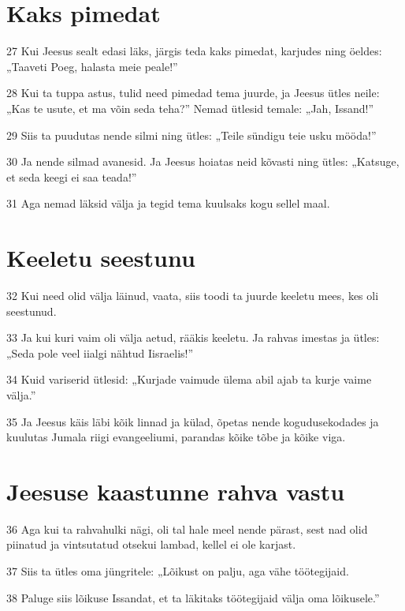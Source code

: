 \section*{Kaks pimedat}

\par 27 Kui Jeesus sealt edasi läks, järgis teda kaks pimedat, karjudes ning öeldes: „Taaveti Poeg, halasta meie peale!”
\par 28 Kui ta tuppa astus, tulid need pimedad tema juurde, ja Jeesus ütles neile: „Kas te usute, et ma võin seda teha?” Nemad ütlesid temale: „Jah, Issand!”
\par 29 Siis ta puudutas nende silmi ning ütles: „Teile sündigu teie usku mööda!”
\par 30 Ja nende silmad avanesid. Ja Jeesus hoiatas neid kõvasti ning ütles: „Katsuge, et seda keegi ei saa teada!”
\par 31 Aga nemad läksid välja ja tegid tema kuulsaks kogu sellel maal.

\section*{Keeletu seestunu}

\par 32 Kui need olid välja läinud, vaata, siis toodi ta juurde keeletu mees, kes oli seestunud.
\par 33 Ja kui kuri vaim oli välja aetud, rääkis keeletu. Ja rahvas imestas ja ütles: „Seda pole veel iialgi nähtud Iisraelis!”
\par 34 Kuid variserid ütlesid: „Kurjade vaimude ülema abil ajab ta kurje vaime välja.”
\par 35 Ja Jeesus käis läbi kõik linnad ja külad, õpetas nende kogudusekodades ja kuulutas Jumala riigi evangeeliumi, parandas kõike tõbe ja kõike viga.

\section*{Jeesuse kaastunne rahva vastu}

\par 36 Aga kui ta rahvahulki nägi, oli tal hale meel nende pärast, sest nad olid piinatud ja vintsutatud otsekui lambad, kellel ei ole karjast.
\par 37 Siis ta ütles oma jüngritele: „Lõikust on palju, aga vähe töötegijaid.
\par 38 Paluge siis lõikuse Issandat, et ta läkitaks töötegijaid välja oma lõikusele.”


